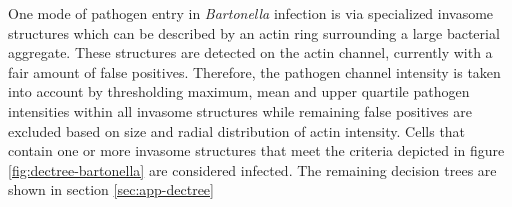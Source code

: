 One mode of pathogen entry in \textit{Bartonella} infection is via specialized invasome structures which can be described by an actin ring surrounding a large bacterial aggregate. These structures are detected on the actin channel, currently with a fair amount of false positives. Therefore, the pathogen channel intensity is taken into account by thresholding maximum, mean and upper quartile pathogen intensities within all invasome structures while remaining false positives are excluded based on size and radial distribution of actin intensity. Cells that contain one or more invasome structures that meet the criteria depicted in figure \ref{fig:dectree-bartonella} are considered infected. The remaining decision trees are shown in section \ref{sec:app-dectree}

